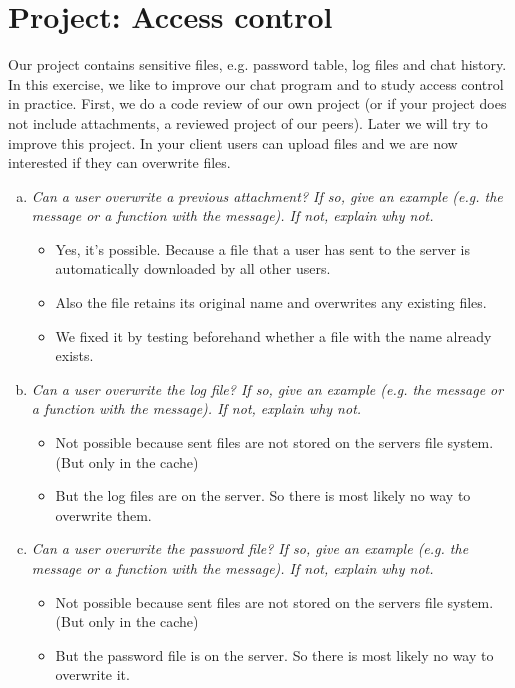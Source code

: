 \section{Project: Access control}
Our project contains sensitive files, e.g. password table, log files and chat history. In this exercise, we like to improve our chat program and to study access control in practice. First, we do a code review of our own project (or if your project does not include attachments, a reviewed project of our peers). Later we will try to improve this project. In your client users can upload files and we are now interested if they can overwrite files.
\begin{enumerate}[(a)]
    \item {\itshape Can a user overwrite a previous attachment? If so, give an example (e.g. the message or a function with the message). If not, explain why not.}
    \begin{itemize}
        \item Yes, it's possible. Because a file that a user has sent to the server is automatically downloaded by all other users.
        \item Also the file retains its original name and overwrites any existing files.
        

        \item We fixed it by testing beforehand whether a file with the name already exists.
        
    \end{itemize}
    
    \item {\itshape Can  a  user  overwrite  the  log  file?  If  so,  give  an  example  (e.g.  the  message  or  a function with the message). If not, explain why not.}
    \begin{itemize}
        \item Not possible because sent files are not stored on the servers file system. (But only in the cache)
        \item But the log files are on the server. So there is most likely no way to overwrite them.
    \end{itemize}

    \item {\itshape Can a user overwrite the password file? If so, give an example (e.g. the message or a function with the message). If not, explain why not.}
    \begin{itemize}
        \item Not possible because sent files are not stored on the servers file system. (But only in the cache)
        \item But the password file is on the server. So there is most likely no way to overwrite it.
    \end{itemize}


\end{enumerate}
